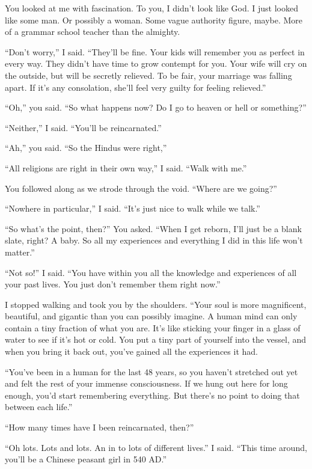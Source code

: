 You looked at me with fascination. To you, I didn't look like God. I just looked like some man. Or possibly a woman. Some vague authority figure, maybe. More of a grammar school teacher than the almighty.

“Don't worry,” I said. “They'll be fine. Your kids will remember you as perfect in every way. They didn't have time to grow contempt for you. Your wife will cry on the outside, but will be secretly relieved. To be fair, your marriage was falling apart. If it's any consolation, she'll feel very guilty for feeling relieved.”

“Oh,” you said. “So what happens now? Do I go to heaven or hell or something?”

“Neither,” I said. “You'll be reincarnated.”

“Ah,” you said. “So the Hindus were right,”

“All religions are right in their own way,” I said. “Walk with me.”

You followed along as we strode through the void. “Where are we going?”

“Nowhere in particular,” I said. “It's just nice to walk while we talk.”

“So what's the point, then?” You asked. “When I get reborn, I'll just be a blank slate, right? A baby. So all my experiences and everything I did in this life won't matter.”

“Not so!” I said. “You have within you all the knowledge and experiences of all your past lives. You just don't remember them right now.”

I stopped walking and took you by the shoulders. “Your soul is more magnificent, beautiful, and gigantic than you can possibly imagine. A human mind can only contain a tiny fraction of what you are. It's like sticking your finger in a glass of water to see if it's hot or cold. You put a tiny part of yourself into the vessel, and when you bring it back out, you've gained all the experiences it had.

“You've been in a human for the last 48 years, so you haven't stretched out yet and felt the rest of your immense consciousness. If we hung out here for long enough, you'd start remembering everything. But there's no point to doing that between each life.”

“How many times have I been reincarnated, then?”

“Oh lots. Lots and lots. An in to lots of different lives.” I said. “This time around, you'll be a Chinese peasant girl in 540 AD.”

